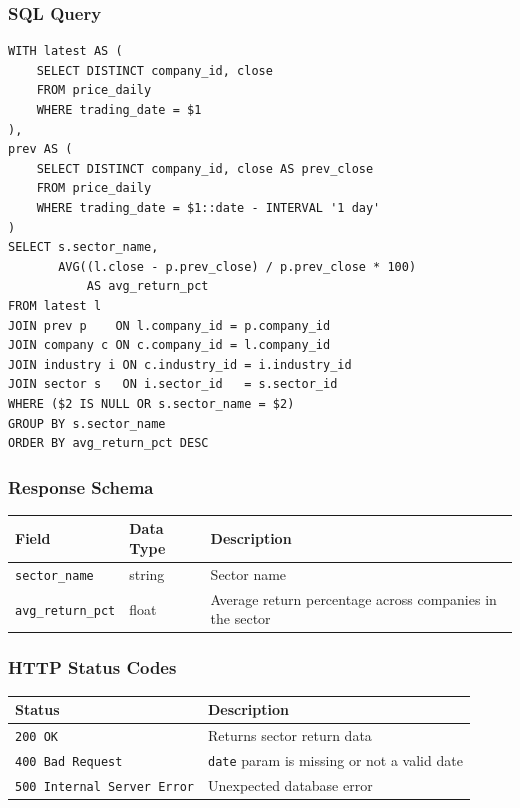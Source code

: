 \documentclass[11pt]{article}
\begin{document}
\subsubsection*{SQL Query}
\begin{lstlisting}[style=sql,basicstyle=\ttfamily\scriptsize]
WITH latest AS (
    SELECT DISTINCT company_id, close
    FROM price_daily
    WHERE trading_date = $1
),
prev AS (
    SELECT DISTINCT company_id, close AS prev_close
    FROM price_daily
    WHERE trading_date = $1::date - INTERVAL '1 day'
)
SELECT s.sector_name,
       AVG((l.close - p.prev_close) / p.prev_close * 100)
           AS avg_return_pct
FROM latest l
JOIN prev p    ON l.company_id = p.company_id
JOIN company c ON c.company_id = l.company_id
JOIN industry i ON c.industry_id = i.industry_id
JOIN sector s   ON i.sector_id   = s.sector_id
WHERE ($2 IS NULL OR s.sector_name = $2)
GROUP BY s.sector_name
ORDER BY avg_return_pct DESC
\end{lstlisting}

\subsubsection*{Response Schema}

\begin{center}
\small
\begin{tabular}{l l p{7cm}}
\toprule
\textbf{Field} & \textbf{Data Type} & \textbf{Description} \\
\midrule
\texttt{sector\_name}     & string & Sector name \\
\texttt{avg\_return\_pct} & float  & Average return percentage across companies in the sector \\
\bottomrule
\end{tabular}
\end{center}

\subsubsection*{HTTP Status Codes}

\begin{center}
\small
\begin{tabular}{l p{8cm}}
\toprule
\textbf{Status} & \textbf{Description} \\
\midrule
\texttt{200 OK} & Returns sector return data \\
\texttt{400 Bad Request} & \texttt{date} param is missing or not a valid date \\
\texttt{500 Internal Server Error} & Unexpected database error \\
\bottomrule
\end{tabular}
\end{center}
\end{document}
